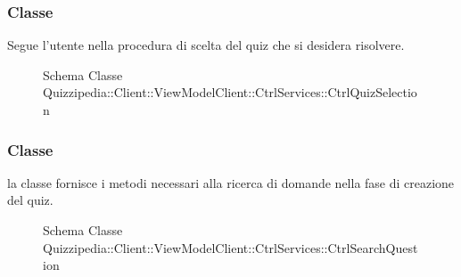 \subsubsection{Classe }
Segue l'utente nella procedura di scelta del quiz che si desidera risolvere.
\begin{figure}[H]
\centering
\noindent{}
\caption[Schema Classe CtrlQuizSelection]{Schema Classe Quizzipedia::Client::ViewModelClient::CtrlServices::CtrlQuizSelection}
\end{figure}
\subsubsection{Classe }
la classe fornisce i metodi necessari alla ricerca di domande nella fase di creazione del quiz.
\begin{figure}[H]
\centering
\noindent{}
\caption[Schema Classe CtrlSearchQuestion]{Schema Classe Quizzipedia::Client::ViewModelClient::CtrlServices::CtrlSearchQuestion}
\end{figure}
